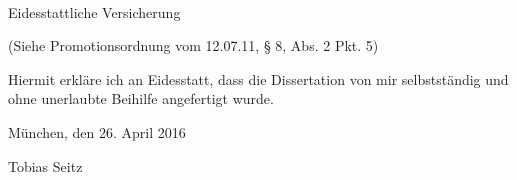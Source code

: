






~\vfill

\begin{Large}Eidesstattliche Versicherung\end{Large}

\begin{small}(Siehe Promotionsordnung vom 12.07.11, § 8, Abs. 2 Pkt. 5)\end{small}


Hiermit erkl\"{a}re ich an Eidesstatt, dass die Dissertation von mir selbstst\"{a}ndig und ohne unerlaubte Beihilfe angefertigt wurde.

München, den 26. April 2016


\vspace{2cm}


\hfill Tobias Seitz
~\vfill


